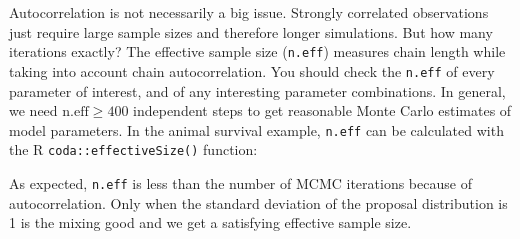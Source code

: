 \documentclass[
  12pt,
]{krantz}
\newenvironment{Shaded}{\begin{snugshade}}{\end{snugshade}}
\newcommand{\DecValTok}[1]{\textcolor[rgb]{0.00,0.00,0.81}{#1}}
\newcommand{\DocumentationTok}[1]{\textcolor[rgb]{0.56,0.35,0.01}{\textbf{\textit{#1}}}}
\newcommand{\FloatTok}[1]{\textcolor[rgb]{0.00,0.00,0.81}{#1}}
\newcommand{\FunctionTok}[1]{\textcolor[rgb]{0.13,0.29,0.53}{\textbf{#1}}}
\newcommand{\NormalTok}[1]{#1}
\newcommand{\OtherTok}[1]{\textcolor[rgb]{0.56,0.35,0.01}{#1}}
\newcommand{\SpecialCharTok}[1]{\textcolor[rgb]{0.81,0.36,0.00}{\textbf{#1}}}
\newcommand{\StringTok}[1]{\textcolor[rgb]{0.31,0.60,0.02}{#1}}
\begin{document}
Autocorrelation is not necessarily a big issue. Strongly correlated observations just require large sample sizes and therefore longer simulations. But how many iterations exactly? The effective sample size (\texttt{n.eff}) measures chain length while taking into account chain autocorrelation. You should check the \texttt{n.eff} of every parameter of interest, and of any interesting parameter combinations. In general, we need \(\text{n.eff} \geq 400\) independent steps to get reasonable Monte Carlo estimates of model parameters. In the animal survival example, \texttt{n.eff} can be calculated with the R \texttt{coda::effectiveSize()} function:

\begin{Shaded}
\end{Shaded}

As expected, \texttt{n.eff} is less than the number of MCMC iterations because of autocorrelation. Only when the standard deviation of the proposal distribution is 1 is the mixing good and we get a satisfying effective sample size.
\end{document}
